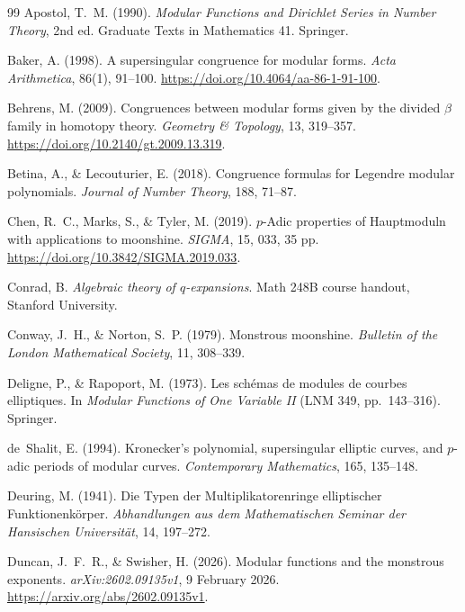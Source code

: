\documentclass[11pt,a4paper]{article}
\numberwithin{equation}{section}
\theoremstyle{definition}
\theoremstyle{remark}
\begin{document}
\begin{thebibliography}{99}\small
{} Apostol, T.~M. (1990). \emph{Modular Functions and Dirichlet Series in Number Theory}, 2nd ed. Graduate Texts in Mathematics 41. Springer.

 Baker, A. (1998). A supersingular congruence for modular forms.
\emph{Acta Arithmetica}, 86(1), 91--100. \url{https://doi.org/10.4064/aa-86-1-91-100}.

 Behrens, M. (2009). Congruences between modular forms given by the divided $\beta$ family in homotopy theory. \emph{Geometry \& Topology}, 13, 319--357. \url{https://doi.org/10.2140/gt.2009.13.319}.

 Betina, A., \& Lecouturier, E. (2018). Congruence formulas for
Legendre modular polynomials. \emph{Journal of Number Theory}, 188, 71--87.

 Chen, R.~C., Marks, S., \& Tyler, M. (2019).
$p$-Adic properties of Hauptmoduln with applications to moonshine.
\emph{SIGMA}, 15, 033, 35 pp. \url{https://doi.org/10.3842/SIGMA.2019.033}.

 Conrad, B. \emph{Algebraic theory of $q$-expansions}. Math 248B course handout, Stanford University.

 Conway, J.~H., \& Norton, S.~P. (1979). Monstrous moonshine.
\emph{Bulletin of the London Mathematical Society}, 11, 308--339.

 Deligne, P., \& Rapoport, M. (1973). Les sch\'emas de modules de
courbes elliptiques. In \emph{Modular Functions of One Variable II} (LNM 349, pp.~143--316). Springer.

 de~Shalit, E. (1994). Kronecker's polynomial, supersingular elliptic curves,
and $p$-adic periods of modular curves. \emph{Contemporary Mathematics}, 165, 135--148.

 Deuring, M. (1941). Die Typen der Multiplikatorenringe elliptischer Funktionenk\"orper. \emph{Abhandlungen aus dem Mathematischen Seminar der Hansischen Universit\"at}, 14, 197--272.

 Duncan, J.~F.~R., \& Swisher, H. (2026).
Modular functions and the monstrous exponents. \emph{arXiv:2602.09135v1},
9 February 2026. \url{https://arxiv.org/abs/2602.09135v1}.


\end{thebibliography}
\end{document}
